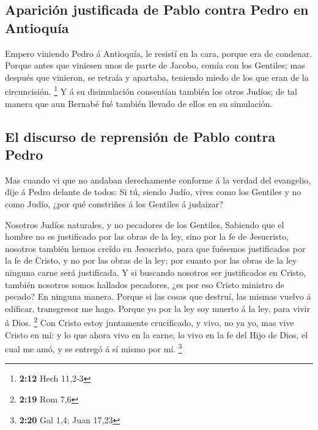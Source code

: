 \hypertarget{apariciuxf3n-justificada-de-pablo-contra-pedro-en-antioquuxeda}{%
\subsection{Aparición justificada de Pablo contra Pedro en
Antioquía}\label{apariciuxf3n-justificada-de-pablo-contra-pedro-en-antioquuxeda}}

 Empero viniendo Pedro á Antioquía, le resistí en la cara,
porque era de condenar.  Porque antes que viniesen unos de
parte de Jacobo, comía con los Gentiles; mas después que vinieron, se
retraía y apartaba, teniendo miedo de los que eran de la circuncisión.
\footnote{\textbf{2:12} Hech 11,2-3}  Y á su disimulación
consentían también los otros Judíos; de tal manera que aun Bernabé fué
también llevado de ellos en su simulación.

\hypertarget{el-discurso-de-reprensiuxf3n-de-pablo-contra-pedro}{%
\subsection{El discurso de reprensión de Pablo contra
Pedro}\label{el-discurso-de-reprensiuxf3n-de-pablo-contra-pedro}}

 Mas cuando vi que no andaban derechamente conforme á la
verdad del evangelio, dije á Pedro delante de todos: Si tú, siendo
Judío, vives como los Gentiles y no como Judío, ¿por qué constriñes á
los Gentiles á judaizar?

 Nosotros Judíos naturales, y no pecadores de los Gentiles,
 Sabiendo que el hombre no es justificado por las obras de
la ley, sino por la fe de Jesucristo, nosotros también hemos creído en
Jesucristo, para que fuésemos justificados por la fe de Cristo, y no por
las obras de la ley; por cuanto por las obras de la ley ninguna carne
será justificada.  Y si buscando nosotros ser justificados
en Cristo, también nosotros somos hallados pecadores, ¿es por eso Cristo
ministro de pecado? En ninguna manera.  Porque si las cosas
que destruí, las mismas vuelvo á edificar, transgresor me hago.
 Porque yo por la ley soy muerto á la ley, para vivir á
Dios. \footnote{\textbf{2:19} Rom 7,6}  Con Cristo estoy
juntamente crucificado, y vivo, no ya yo, mas vive Cristo en mí: y lo
que ahora vivo en la carne, lo vivo en la fe del Hijo de Dios, el cual
me amó, y se entregó á sí mismo por mí. \footnote{\textbf{2:20} Gal 1,4;
  Juan 17,23}

